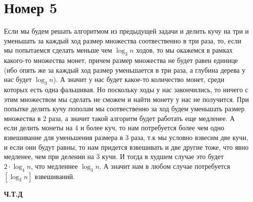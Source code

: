 \documentclass[a4paper,12pt]{article}
\begin{document}
\section*{Номер 5}
Если мы будем решать алгоритмом из предыдущей задачи и делить кучу на три и уменьшать за каждый ход размер множества соотвественно в три раза, то, если мы попытаемся сделать меньше чем $\log_3 n$ ходов, то мы окажемся в рамках какого-то множества монет, причем размер множества не будет равен единице (ибо опять же за каждый ход размер уменьшается в три раза, а глубина дерева у нас будет $\log_3 n$). А значит у нас будет какое-то количество монет, среди которых есть одна фальшивая. Но поскольку ходы у нас закончились, то ничего с этим множеством мы сделать не сможем и найти монету у нас не получится. При попытке делить кучу пополам мы соотвественно за ход будем уменьшать размер множества в 2 раза, а значит такой алгоритм будет работать еще медленее. А если делить монеты на 4 и более куч, то нам потребуется более чем одно взвешивание для уменьшения размера в 3 раза, т.к мы условно взвесим две кучи, и если они будут равны, то нам придется взвешивать и две другие тоже, что явно медленее, чем при делении на 3 кучи. И тогда в худшем случае это будет $2 \cdot \log_4 n$, что медленнее $\log_3 n$. А значит нам в любом случае потребуется $[ \log_3 n]$ взвешиваний.
\begin{center}
\textbf{Ч.Т.Д}
\end{center}
\end{document}
